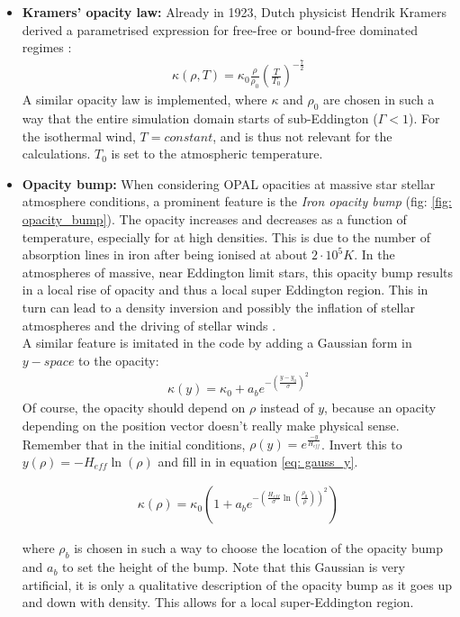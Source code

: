 \begin{itemize}
\item \textbf{Kramers' opacity law:} Already in 1923, Dutch physicist Hendrik Kramers derived a parametrised expression for free-free or bound-free dominated regimes \citep{Carroll1996}:
\begin{align}
\kappa(\rho,T) = \kappa_0 \frac{\rho}{\rho_0} \left(\frac{T}{T_0}\right)^{-\frac{7}{2}}
\end{align}
A similar opacity law is implemented, where $\kappa$ and $\rho_0$ are chosen in such a way that the entire simulation domain starts of sub-Eddington ($\Gamma < 1$). For the isothermal wind, $T = constant$, and is thus not relevant for the calculations. $T_0$ is set to the atmospheric temperature. \\


\item \textbf{Opacity bump:} When considering OPAL opacities at massive star stellar atmosphere conditions, a prominent feature is the \emph{Iron opacity bump} \citep{Owocki2014} (fig: \ref{fig: opacity_bump}). The opacity increases and decreases  as a function of temperature, especially for at high densities. This is due to the number of absorption lines in iron after being ionised at about $2 \cdot 10^5 K$. In the atmospheres of massive, near Eddington limit stars, this opacity bump results in a local rise of opacity and thus a local super Eddington region. This in turn can lead to a density inversion and possibly the inflation of stellar atmospheres and the driving of stellar winds \citep{Petrovic2006}.\\

A similar feature is imitated in the code by adding a Gaussian form in $y-space$ to the opacity:
\begin{align}
\kappa(y) = \kappa_0 + a_b e^{-\left(\frac{y-y_0}{\sigma}\right)^2} \label{eq: gauss_y}
\end{align}
Of course, the opacity should depend on $\rho$ instead of $y$, because an opacity depending on the position vector doesn't really make physical sense. Remember that in the initial conditions, $\rho(y) = e^{\frac{-y}{H_{eff}}}$. Invert this to $y(\rho) = -H_{eff}\ln(\rho)$ and fill in in equation \eqref{eq: gauss_y}.

\begin{align}
\kappa(\rho) = \kappa_0 \left(1 + a_{b} e^{-\left( \frac{H_{eff}}{\sigma} \ln\left( \frac{\rho_0}{\rho} \right)\right)^2} \right)
\end{align}

where $\rho_{b}$ is chosen in such a way to choose the location of the opacity bump and $a_{b}$ to set the height of the bump. Note that this Gaussian is very artificial, it is only a qualitative description of the opacity bump as it goes up and down with density. This allows for a local super-Eddington region.
\end{itemize}

